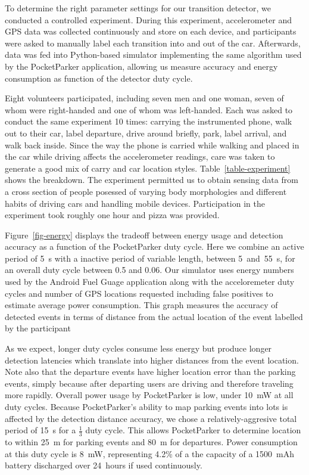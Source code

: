 To determine the right parameter settings for our transition detector, we
conducted a controlled experiment. During this experiment, accelerometer and
GPS data was collected continuously and store on each device, and
participants were asked to manually label each transition into and out of the
car. Afterwards, data was fed into Python-based simulator implementing the
same algorithm used by the PocketParker application, allowing us measure
accuracy and energy consumption as function of the detector duty cycle.

Eight volunteers participated, including seven men and one woman, seven of
whom were right-handed and one of whom was left-handed. Each was asked to
conduct the same experiment 10 times: carrying the instrumented phone, walk
out to their car, label departure, drive around briefly, park, label arrival,
and walk back inside. Since the way the phone is carried while walking and
placed in the car while driving affects the accelerometer readings, care was
taken to generate a good mix of carry and car location styles.
Table~\ref{table-experiment} shows the breakdown. The experiment permitted us
to obtain sensing data from a cross section of people posessed of varying
body morphologies and different habits of driving cars and handling mobile
devices. Participation in the experiment took roughly one hour and pizza was
provided.

Figure~\ref{fig-energy} displays the tradeoff between energy usage and
detection accuracy as a function of the PocketParker duty cycle. Here we
combine an active period of 5~s with a inactive period of variable length,
between 5~and~55~s, for an overall duty cycle between 0.5 and 0.06. Our
simulator uses energy numbers used by the Android Fuel Guage application
along with the acceloremeter duty cycles and number of GPS locations
requested including false positives to estimate average power consumption.
This graph measures the accuracy of detected events in terms of distance from
the actual location of the event labelled by the participant

As we expect, longer duty cycles consume less energy but produce longer
detection latencies which translate into higher distances from the event
location. Note also that the departure events have higher location error than
the parking events, simply because after departing users are driving and
therefore traveling more rapidly. Overall power usage by PocketParker is low,
under 10~mW at all duty cycles. Because PocketParker's ability to map parking
events into lots is affected by the detection distance accuracy, we chose a
relatively-aggresive total period of 15~s for a $\frac{1}{3}$ duty cycle.
This allows PocketParker to determine location to within 25~m for parking
events and 80~m for departures. Power consumption at this duty cycle is 8~mW,
representing 4.2\% of a the capacity of a 1500~mAh battery discharged over
24~hours if used continuously.

